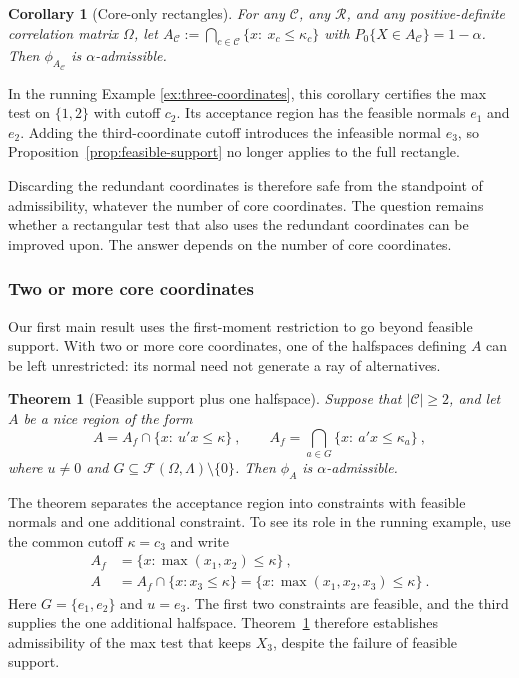 \documentclass[11pt]{article}
\numberwithin{equation}{section}
\newtheorem{theorem}{Theorem}
\newtheorem{corollary}{Corollary}
\theoremstyle{definition}
\begin{document}
\begin{corollary}[Core-only rectangles]\label{cor:core-only}
For any $\mathcal C$, any $\mathcal R$, and any positive-definite correlation matrix $\Omega$, let $A_{\mathcal C}:=\bigcap_{c\in\mathcal C}\{x:\ x_c\le\kappa_c\}$ with $P_0\{X\in A_{\mathcal C}\}=1-\alpha$. Then $\phi_{A_{\mathcal C}}$ is $\alpha$-admissible.
\end{corollary}

In the running Example \ref{ex:three-coordinates}, this corollary certifies the max test on $\{1,2\}$ with cutoff $c_2$. Its acceptance region has the feasible normals $e_1$ and $e_2$. Adding the third-coordinate cutoff introduces the infeasible normal $e_3$, so Proposition~\ref{prop:feasible-support} no longer applies to the full rectangle.

Discarding the redundant coordinates is therefore safe from the standpoint of admissibility, whatever the number of core coordinates. The question remains whether a rectangular test that also uses the redundant coordinates can be improved upon. The answer depends on the number of core coordinates.

\subsubsection*{Two or more core coordinates}

Our first main result uses the first-moment restriction to go beyond feasible support. With two or more core coordinates, one of the halfspaces defining $A$ can be left unrestricted: its normal need not generate a ray of alternatives.


\begin{theorem}[Feasible support plus one halfspace]\label{thm:one-extra}
Suppose that $|\mathcal C|\ge2$, and let $A$ be a nice region of the form
\[
A=A_f\cap\{x:\ u'x\le\kappa\}~,
\qquad
A_f=\bigcap_{a\in G}\{x:\ a'x\le\kappa_a\}~,
\]
where $u\ne0$ and $G\subseteq\mathcal F(\Omega,\Lambda)\setminus\{0\}$. Then $\phi_A$ is $\alpha$-admissible.
\end{theorem}

The theorem separates the acceptance region into constraints with feasible normals and one additional constraint. To see its role in the running example, use the common cutoff $\kappa=c_3$ and write
\[
\begin{split}
A_f&=\{x:\max(x_1,x_2)\le\kappa\}~,\\
A&=A_f\cap\{x:x_3\le\kappa\}
 =\{x:\max(x_1,x_2,x_3)\le\kappa\}~.
\end{split}
\]
Here $G=\{e_1,e_2\}$ and $u=e_3$. The first two constraints are feasible, and the third supplies the one additional halfspace. Theorem~\ref{thm:one-extra} therefore establishes admissibility of the max test that keeps $X_3$, despite the failure of feasible support.
\end{document}
